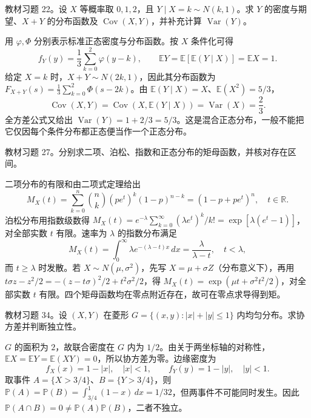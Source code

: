 \begin{example}
\label{ex:study-exercise4-22}
教材习题 22。设 $X$ 等概率取 $0,1,2$，且 $Y\mid X=k\sim N(k,1)$。求 $Y$ 的密度与期望、$X+Y$ 的分布函数及 $\operatorname{Cov}(X,Y)$，并补充计算 $\operatorname{Var}(Y)$。
\end{example}

\begin{solve}
用 $\varphi,\Phi$ 分别表示标准正态密度与分布函数。按 $X$ 条件化可得
\[
  f_Y(y)=\frac13\sum_{k=0}^2\varphi(y-k),\qquad
  \mathbb E Y=\mathbb E[\mathbb E(Y\mid X)]=\mathbb E X=1.
\]
给定 $X=k$ 时，$X+Y\sim N(2k,1)$，因此其分布函数为 $F_{X+Y}(s)=\frac13\sum_{k=0}^2\Phi(s-2k)$。由 $\mathbb E(Y\mid X)=X$、$\mathbb E(X^2)=5/3$，
\[
  \operatorname{Cov}(X,Y)
    =\operatorname{Cov}(X,\mathbb E(Y\mid X))
    =\operatorname{Var}(X)=\frac23.
\]
全方差公式又给出 $\operatorname{Var}(Y)=1+2/3=5/3$。这是混合正态分布，一般不能把它仅因每个条件分布都正态便当作一个正态分布。
\end{solve}

\begin{example}
\label{ex:study-exercise4-27}
教材习题 27。分别求二项、泊松、指数和正态分布的矩母函数，并核对存在区间。
\end{example}

\begin{solve}
二项分布的有限和由二项式定理给出
\[
  M_X(t)=\sum_{k=0}^n\binom nk(pe^t)^k(1-p)^{n-k}
    =(1-p+pe^t)^n,\quad t\in\mathbb R.
\]
泊松分布用指数级数得 $M_X(t)=e^{-\lambda}\sum_{k=0}^{\infty}(\lambda e^t)^k/k!=\exp[\lambda(e^t-1)]$，对全部实数 $t$ 有限。速率为 $\lambda$ 的指数分布满足
\[
  M_X(t)=\int_0^\infty\lambda e^{-(\lambda-t)x}\,dx
    =\frac{\lambda}{\lambda-t},\quad t<\lambda,
\]
而 $t\ge\lambda$ 时发散。若 $X\sim N(\mu,\sigma^2)$，先写 $X=\mu+\sigma Z$（分布意义下），再用 $t\sigma z-z^2/2=-(z-t\sigma)^2/2+t^2\sigma^2/2$，得 $M_X(t)=\exp(\mu t+\sigma^2t^2/2)$，对全部实数 $t$ 有限。四个矩母函数均在零点附近存在，故可在零点求导得到矩。
\end{solve}

\begin{example}
\label{ex:study-exercise4-34}
教材习题 34。设 $(X,Y)$ 在菱形 $G=\{(x,y):|x|+|y|\le1\}$ 内均匀分布。求协方差并判断独立性。
\end{example}

\begin{solve}
$G$ 的面积为 $2$，故联合密度在 $G$ 内为 $1/2$。由关于两坐标轴的对称性，$\mathbb E X=\mathbb E Y=\mathbb E(XY)=0$，所以协方差为零。边缘密度为
\[
  f_X(x)=1-|x|,\quad |x|<1,
  \qquad f_Y(y)=1-|y|,\quad |y|<1.
\]
取事件 $A=\{X>3/4\}$、$B=\{Y>3/4\}$，则 $\mathbb P(A)=\mathbb P(B)=\int_{3/4}^1(1-x)\,dx=1/32$，但两事件不可能同时发生。因此 $\mathbb P(A\cap B)=0\ne\mathbb P(A)\mathbb P(B)$，二者不独立。
\end{solve}

